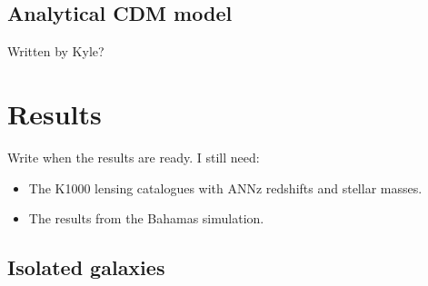 \documentclass[fleqn,usenatbib]{mnras}
\begin{document}
\subsection{Analytical CDM model}
\label{sec:analytical}
Written by Kyle?

\section{Results}
\label{sec:results}
Write when the results are ready.
I still need:
\begin{itemize}
	\item The K1000 lensing catalogues with ANNz redshifts and stellar masses.
	\item The results from the Bahamas simulation.
\end{itemize}

\subsection{Isolated galaxies}
\end{document}
